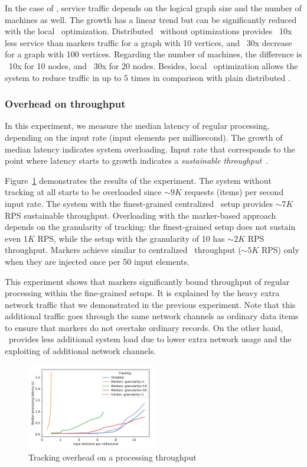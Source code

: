 In the case of \tracker , service traffic depends on the logical graph size and the number of machines as well. The growth has a linear trend but can be significantly reduced with the local \tracker\ optimization. Distributed \tracker\ without optimizations provides ~10x less service than markers traffic for a graph with 10 vertices, and ~30x decrease for a graph with 100 vertices. Regarding the number of machines, the difference is ~10x for 10 nodes, and ~30x for 20 nodes. Besides, local \tracker\ optimization allows the system to reduce traffic in up to 5 times in comparison with plain distributed \tracker .

\subsubsection{Overhead on throughput}

In this experiment, we measure the median latency of regular processing, depending on the input rate (input elements per millisecond). The growth of median latency indicates system overloading. Input rate that corresponds to the point where latency starts to growth indicates a {\em sustainable throughput}~\cite{karimov2018benchmarking}.

Figure~\ref{throughput_overhead} demonstrates the results of the experiment. The system without tracking at all starts to be overloaded since $\sim 9K$ requests (items) per second input rate. The system with the finest-grained centralized \tracker\ setup provides $\sim 7K$ RPS sustainable throughput. Overloading with the marker-based approach depends on the granularity of tracking: the finest-grained setup does not sustain even $1K$ RPS, while the setup with the granularity of 10 has $\sim 2K$ RPS throughput. Markers achieve similar to centralized \tracker\ throughput ($\sim 5K$ RPS) only when they are injected once per 50 input elements.

This experiment shows that markers significantly bound throughput of regular processing within the fine-grained setups. It is explained by the heavy extra network traffic that we demonstrated in the previous experiment. Note that this additional traffic goes through the same network channels as ordinary data items to ensure that markers do not overtake ordinary records. On the other hand, \tracker\ provides less additional system load due to lower extra network usage and the exploiting of additional network channels.

\begin{figure}[htbp]
  \centering
  \includegraphics[width=0.50\textwidth]{pics/throughput_overhead_50.pdf}
  \caption{Tracking overhead on a processing throughput}
  \label{throughput_overhead}
\end{figure}

